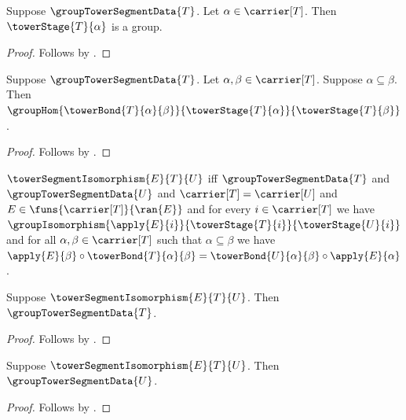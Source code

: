 \begin{proposition}\label{group_tower_segment_data_stage}
    Suppose $\groupTowerSegmentData{T}$.
    Let $\alpha\in\carrier[T]$.
    Then $\towerStage{T}{\alpha}$ is a group.
\end{proposition}
\begin{proof}
    Follows by .
\end{proof}

\begin{proposition}\label{group_tower_segment_data_bond}
    Suppose $\groupTowerSegmentData{T}$.
    Let $\alpha,\beta\in\carrier[T]$.
    Suppose $\alpha\subseteq\beta$.
    Then $\groupHom{\towerBond{T}{\alpha}{\beta}}
        {\towerStage{T}{\alpha}}{\towerStage{T}{\beta}}$.
\end{proposition}
\begin{proof}
    Follows by .
\end{proof}

\begin{definition}\label{tower_segment_isomorphism}
    $\towerSegmentIsomorphism{E}{T}{U}$ iff
        $\groupTowerSegmentData{T}$ and
        $\groupTowerSegmentData{U}$ and
        $\carrier[T]=\carrier[U]$ and
        $E\in\funs{\carrier[T]}{\ran{E}}$ and
        for every $i\in\carrier[T]$ we have
            $\groupIsomorphism{\apply{E}{i}}
                {\towerStage{T}{i}}{\towerStage{U}{i}}$ and
        for all $\alpha,\beta\in\carrier[T]$ such that
            $\alpha\subseteq\beta$ we have
            $\apply{E}{\beta}\circ\towerBond{T}{\alpha}{\beta}=
                \towerBond{U}{\alpha}{\beta}\circ\apply{E}{\alpha}$.
\end{definition}

\begin{proposition}\label{tower_segment_isomorphism_source}
    Suppose $\towerSegmentIsomorphism{E}{T}{U}$.
    Then $\groupTowerSegmentData{T}$.
\end{proposition}
\begin{proof}
    Follows by .
\end{proof}

\begin{proposition}\label{tower_segment_isomorphism_target}
    Suppose $\towerSegmentIsomorphism{E}{T}{U}$.
    Then $\groupTowerSegmentData{U}$.
\end{proposition}
\begin{proof}
    Follows by .
\end{proof}


